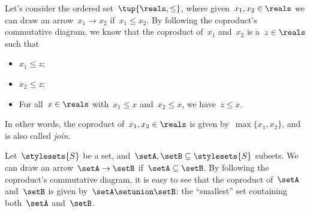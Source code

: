 \begin{example}
	Let's consider the ordered set~$\tup{\reals,\leq}$, where given~$x_1,x_2\in \reals$ we can draw an arrow~$x_1\to x_2$ if~$x_1\leq x_2$.
	By following the coproduct's commutative diagram, we know that the coproduct of~$x_1$ and~$x_2$ is a~$z\in \reals$ such that
	\begin{itemize}
		\item $x_1\leq z$;
		\item $x_2\leq z$;
		\item For all~$x\in \reals$ with~$x_1\leq x$ and~$x_2\leq x$, we have~$z\leq x$.
	\end{itemize}
	In other words, the coproduct of~$x_1,x_2\in \reals$ is given by~$\max\{x_1,x_2\}$, and is also called \emph{join}.
\end{example}

\begin{example}
	\label{ex:subset_coprod}
	Let~$\stylesets{S}$ be a set, and~$\setA,\setB\subseteq \stylesets{S}$ subsets.
	We can draw an arrow~$\setA\to \setB$ if~$\setA\subseteq \setB$.
	By following the coproduct's commutative diagram, it is easy to see that the coproduct of~$\setA$ and~$\setB$ is given by~$\setA\setunion\setB$: the ``smallest'' set containing both~$\setA$ and~$\setB$.
\end{example}

